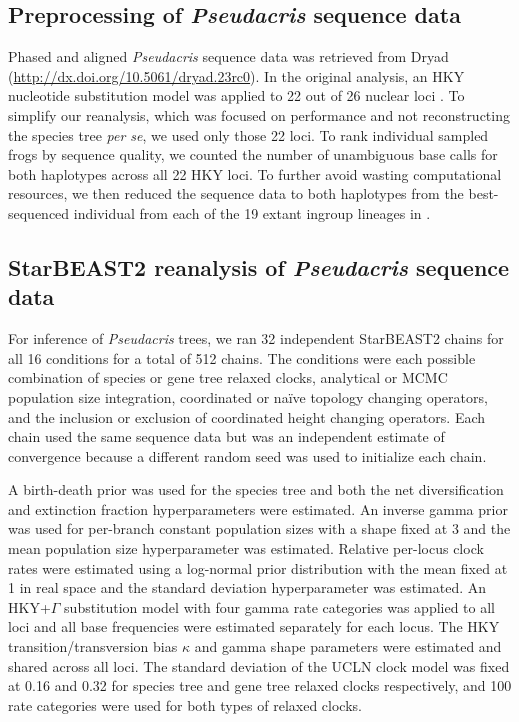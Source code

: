 \documentclass[nogrid]{MBE}%
\begin{document}
\subsection{Preprocessing of \textit{Pseudacris} sequence data}

Phased and aligned \textit{Pseudacris} sequence data was retrieved from Dryad
(\url{http://dx.doi.org/10.5061/dryad.23rc0}). In the original analysis, an HKY nucleotide substitution
model was applied to 22 out of 26 nuclear loci \citep{Barrow201478}. To simplify
our reanalysis, which was focused on performance and not reconstructing the
species tree \textit{per se}, we used only those 22 loci. To rank
individual sampled frogs by sequence quality, we counted the number of unambiguous base
calls for both haplotypes across all 22 HKY loci. To further avoid wasting
computational resources, we then reduced the sequence data to both haplotypes
from the best-sequenced individual from each of the 19 extant ingroup lineages
in \cite{Barrow201478}.

\subsection{StarBEAST2 reanalysis of \textit{Pseudacris} sequence data}

For inference of \textit{Pseudacris} trees, we ran 32 independent StarBEAST2
chains for all 16 conditions for a total of 512 chains. The conditions were each
possible combination of species or gene tree relaxed clocks, analytical or
MCMC population size integration, coordinated or na\"ive topology changing
operators, and the inclusion or exclusion of coordinated height changing
operators. Each chain used the same sequence data but was an independent
estimate of convergence because a different random seed was used to initialize
each chain.

A birth-death prior was used for the species tree and both the net
diversification and extinction fraction hyperparameters were estimated. An
inverse gamma prior was used for per-branch constant population sizes with a
shape fixed at 3 and the mean population size hyperparameter was estimated.
Relative per-locus clock rates were estimated using a log-normal prior
distribution with the mean fixed at 1 in real space and the standard deviation
hyperparameter was estimated. An HKY+$\Gamma$ substitution model with four gamma
rate categories was applied to all loci and all base frequencies were estimated
separately for each locus. The HKY transition/transversion bias $\kappa$ and
gamma shape parameters were estimated and shared across all loci. The standard
deviation of the UCLN clock model was fixed at 0.16 and 0.32 for species tree
and gene tree relaxed clocks respectively, and 100 rate categories were used for
both types of relaxed clocks.
\end{document}
